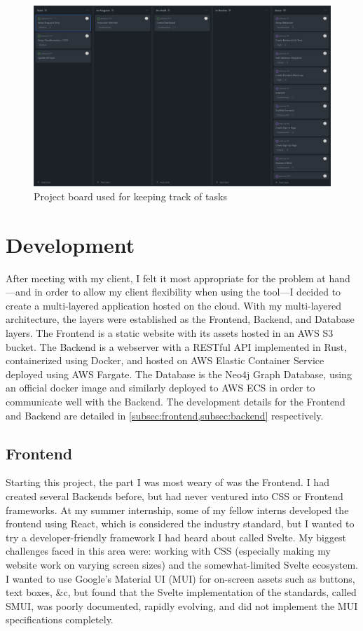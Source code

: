 \documentclass{paper}
\begin{document}
\begin{figure}
  \includegraphics[width=\linewidth]{Github-Project-Board}
  \caption{Project board used for keeping track of tasks}
\end{figure}

\section{Development}
\label{sec:develop}
After meeting with my client, I felt it most appropriate for the problem at hand---and in order to allow my client flexibility when using the tool---I decided to create a multi-layered application hosted on the cloud.
With my multi-layered architecture, the layers were established as the Frontend, Backend, and Database layers.
The Frontend is a static website with its assets hosted in an AWS S3 bucket.
The Backend is a webserver with a RESTful API implemented in Rust, containerized using Docker, and hosted on AWS Elastic Container Service deployed using AWS Fargate.
The Database is the Neo4j Graph Database, using an official docker image and similarly deployed to AWS ECS in order to communicate well with the Backend.
The development details for the Frontend and Backend are detailed in \cref{subsec:frontend,subsec:backend} respectively.

\subsection{Frontend}
\label{subsec:frontend}
Starting this project, the part I was most weary of was the Frontend.
I had created several Backends before, but had never ventured into CSS or Frontend frameworks.
At my summer internship, some of my fellow interns developed the frontend using React, which is considered the industry standard, but I wanted to try a developer-friendly framework I had heard about called Svelte.
My biggest challenges faced in this area were: working with CSS (especially making my website work on varying screen sizes) and the somewhat-limited Svelte ecosystem.
I wanted to use Google's Material UI (MUI) for on-screen assets such as buttons, text boxes, \&c, but found that the Svelte implementation of the standards, called SMUI, was poorly documented, rapidly evolving, and did not implement the MUI specifications completely.
\end{document}
